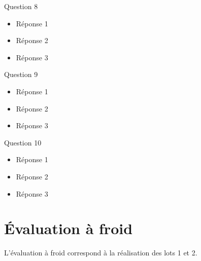 \documentclass[asi, sansVersion]{picInsa}
\begin{document}
			Question 8
			\begin{itemize}
				\item Réponse 1
				\item Réponse 2
				\item Réponse 3
			\end{itemize}
			\vspace{8px}
			
			Question 9
			\begin{itemize}
				\item Réponse 1
				\item Réponse 2
				\item Réponse 3
			\end{itemize}
			\vspace{8px}
			
			Question 10
			\begin{itemize}
				\item Réponse 1
				\item Réponse 2
				\item Réponse 3
			\end{itemize}
			\vspace{8px}
			
			
	\newpage
	\section*{Évaluation à froid}
		L'évaluation à froid correspond à la réalisation des lots 1 et 2.
\end{document}
